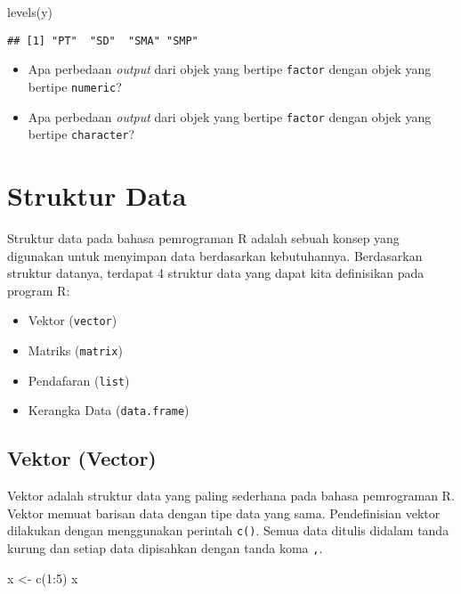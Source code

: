 \documentclass[
]{book}
\newenvironment{Shaded}{\begin{snugshade}}{\end{snugshade}}
\newcommand{\DecValTok}[1]{\textcolor[rgb]{0.00,0.00,0.81}{#1}}
\newcommand{\FunctionTok}[1]{\textcolor[rgb]{0.00,0.00,0.00}{#1}}
\newcommand{\NormalTok}[1]{#1}
\newcommand{\OtherTok}[1]{\textcolor[rgb]{0.56,0.35,0.01}{#1}}
\newcommand{\SpecialCharTok}[1]{\textcolor[rgb]{0.00,0.00,0.00}{#1}}
\providecommand{\tightlist}{%
  \setlength{\itemsep}{0pt}\setlength{\parskip}{0pt}}
\begin{document}
\begin{Shaded}
\begin{Highlighting}[]
\FunctionTok{levels}\NormalTok{(y)}
\end{Highlighting}
\end{Shaded}

\begin{verbatim}
## [1] "PT"  "SD"  "SMA" "SMP"
\end{verbatim}

\begin{itemize}
\tightlist
\item
  Apa perbedaan \emph{output} dari objek yang bertipe \texttt{factor} dengan objek yang bertipe \texttt{numeric}?
\item
  Apa perbedaan \emph{output} dari objek yang bertipe \texttt{factor} dengan objek yang bertipe \texttt{character}?
\end{itemize}

\hypertarget{struktur-data}{%
\chapter{Struktur Data}\label{struktur-data}}

Struktur data pada bahasa pemrograman R adalah sebuah konsep yang digunakan untuk menyimpan data berdasarkan kebutuhannya. Berdasarkan struktur datanya, terdapat 4 struktur data yang dapat kita definisikan pada program R:

\begin{itemize}
\tightlist
\item
  Vektor (\texttt{vector})
\item
  Matriks (\texttt{matrix})
\item
  Pendafaran (\texttt{list})
\item
  Kerangka Data (\texttt{data.frame})
\end{itemize}

\hypertarget{vector}{%
\section{Vektor (Vector)}\label{vector}}

Vektor adalah struktur data yang paling sederhana pada bahasa pemrograman R. Vektor memuat barisan data dengan tipe data yang sama. Pendefinisian vektor dilakukan dengan menggunakan perintah \texttt{c()}. Semua data ditulis didalam tanda kurung dan setiap data dipisahkan dengan tanda koma \texttt{,}.

\begin{Shaded}
\begin{Highlighting}[]
\NormalTok{x }\OtherTok{\textless{}{-}} \FunctionTok{c}\NormalTok{(}\DecValTok{1}\SpecialCharTok{:}\DecValTok{5}\NormalTok{)}
\NormalTok{x}
\end{Highlighting}
\end{Shaded}
\end{document}
